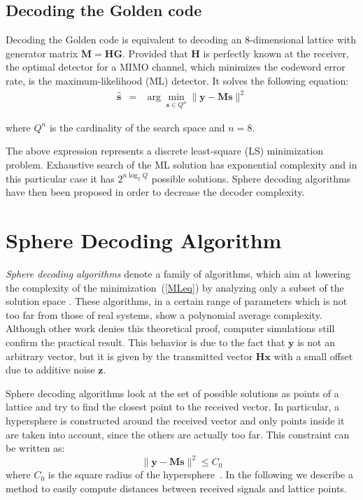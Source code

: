\documentclass[12pt,onecolumn,draftclsnofoot]{IEEEtran}
\begin{document}
\subsection{Decoding the Golden code}
Decoding the Golden code is equivalent to decoding an 8-dimensional lattice
with generator matrix $\boldsymbol{M}=\boldsymbol{HG}$.
Provided that $\boldsymbol{H}$ is perfectly known at the
receiver, the optimal detector for a MIMO channel,
which minimizes the codeword error rate, is the maximum-likelihood (ML) detector.
It solves the following equation:
\begin{eqnarray}
\label{MLeq}
\boldsymbol{\hat{s}} & = & \arg \min_{\boldsymbol {s} \in Q^{n}} \| \boldsymbol {y - Ms} \|^2 \end{eqnarray}

\noindent where $Q^n$ is the cardinality of the search space and $n=8$.

The above expression represents a discrete least-square (LS) minimization problem. Exhaustive search
of the ML solution has exponential complexity and in this particular case it has
$2^{n \log_2 Q}$ possible solutions.
Sphere decoding algorithms have then been proposed in order to decrease
the decoder complexity.


\section{Sphere Decoding Algorithm}

\label{SD}

\emph{Sphere decoding algorithms}  denote a family of algorithms,
which aim at lowering the complexity of the
minimization~(\ref{MLeq}) by analyzing only a subset of the solution
space \cite{Caire&ot1}. These algorithms, in a certain range of
parameters which is not too far from those of real systems, show a
polynomial average complexity.
Although other work \cite{ControCompl} denies this theoretical
proof, computer simulations still confirm the practical result. This
behavior is due to the fact that $\boldsymbol{y}$ is not an
arbitrary vector, but it is given by the transmitted vector
$\boldsymbol{Hx}$ with a small offset due to additive
noise $\boldsymbol{z}$.

Sphere decoding algorithms look at the set of  possible solutions as
points of a lattice and try to find the closest point to the
received vector. In particular, a hypersphere is constructed around
the received vector and only points inside it are taken into
account, since the others are actually too far. This constraint can
be written as:
\begin{equation}
\label{sphere_const}
 \| \boldsymbol {y - Ms} \|^2 \le C_0
\end{equation}
where $C_0$ is the square radius of the
hypersphere~\cite{Pohst,Viterbo93,Viterbo99}.  In the following we
describe a method to  easily compute distances between received
signals and lattice points.
\end{document}
